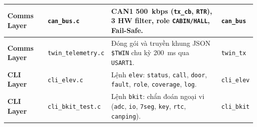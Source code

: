 \begin{xltabular}{\textwidth}{|L{2.2cm}|L{3.3cm}|Y|C{1.8cm}|}
\hline
{}
\textbf{Comms Layer} & \texttt{can\_bus.c} & CAN1 500~kbps (\texttt{tx\_cb}, \texttt{RTR}), 3 HW filter, role \texttt{CABIN/HALL}, Fail-Safe. & \texttt{can\_bus} \\
\hline
\textbf{Comms Layer} & \texttt{twin\_telemetry.c} & Đóng gói và truyền khung JSON \texttt{\$TWIN} chu kỳ 200~ms qua \texttt{USART1}. & \texttt{twin\_tx} \\
\hline
{}
\textbf{CLI Layer} & \texttt{cli\_elev.c} & Lệnh \texttt{elev}: \texttt{status}, \texttt{call}, \texttt{door}, \texttt{fault}, \texttt{role}, \texttt{coverage}, \texttt{log}. & \texttt{cli\_elev} \\
\hline
\textbf{CLI Layer} & \texttt{cli\_bkit\_test.c} & Lệnh \texttt{bkit}: chẩn đoán ngoại vi (\texttt{adc}, \texttt{io}, \texttt{7seg}, \texttt{key}, \texttt{rtc}, \texttt{canping}). & \texttt{cli\_bkit} \\
\end{xltabular}
\endgroup

